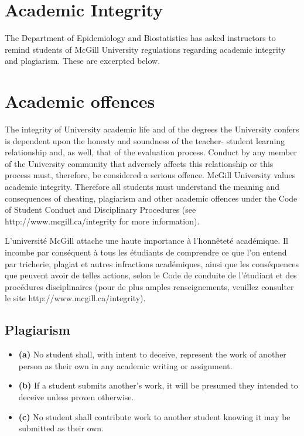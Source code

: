 \documentclass[
  letterpaper,
  DIV=11,
  numbers=noendperiod]{scrartcl}
\providecommand{\tightlist}{%
  \setlength{\itemsep}{0pt}\setlength{\parskip}{0pt}}\usepackage{longtable,booktabs,array}
\begin{document}
\section{Academic Integrity}\label{academic-integrity}

The Department of Epidemiology and Biostatistics has asked instructors
to remind students of McGill University regulations regarding academic
integrity and plagiarism. These are excerpted below.

\section{Academic offences}\label{academic-offences}

The integrity of University academic life and of the degrees the
University confers is dependent upon the honesty and soundness of the
teacher- student learning relationship and, as well, that of the
evaluation process. Conduct by any member of the University community
that adversely affects this relationship or this process must,
therefore, be considered a serious offence. McGill University values
academic integrity. Therefore all students must understand the meaning
and consequences of cheating, plagiarism and other academic offences
under the Code of Student Conduct and Disciplinary Procedures (see
http://www.mcgill.ca/integrity for more information).

L'université McGill attache une haute importance à l'honnêteté
académique. Il incombe par conséquent à tous les étudiants de comprendre
ce que l'on entend par tricherie, plagiat et autres infractions
académiques, ainsi que les conséquences que peuvent avoir de telles
actions, selon le Code de conduite de l'étudiant et des procédures
disciplinaires (pour de plus amples renseignements, veuillez consulter
le site http://www.mcgill.ca/integrity).

\subsection{Plagiarism}\label{plagiarism}

\begin{itemize}
\tightlist
\item
  \textbf{(a)} No student shall, with intent to deceive, represent the
  work of another person as their own in any academic writing or
  assignment.
\item
  \textbf{(b)} If a student submits another's work, it will be presumed
  they intended to deceive unless proven otherwise.
\item
  \textbf{(c)} No student shall contribute work to another student
  knowing it may be submitted as their own.
\end{itemize}
\end{document}
